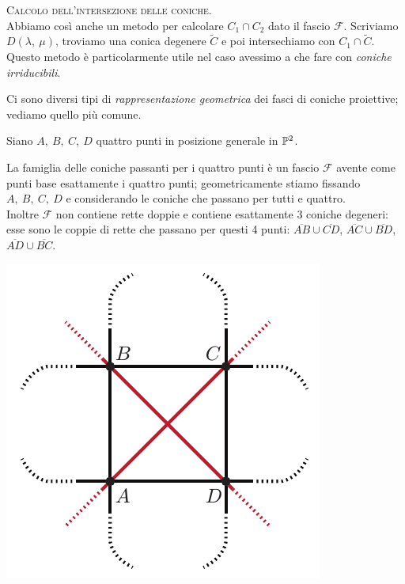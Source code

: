 \begin{tips} \textsc{Calcolo dell'intersezione delle coniche}.\\
	Abbiamo così anche un metodo per calcolare $C_1\cap C_2$ dato il fascio $\mathcal{F}$. Scriviamo $D(\lambda,\ \mu)$, troviamo una conica degenere $\widetilde{C}$ e poi intersechiamo con $C_1\cap\widetilde{C}$. Questo metodo è particolarmente utile nel caso avessimo a che fare con \textit{coniche irriducibili}.
\end{tips}
Ci sono diversi tipi di \textit{rappresentazione geometrica} dei fasci di coniche proiettive; vediamo quello più comune.
\begin{proposition}
	Siano $A,\ B,\ C,\ D$ quattro punti in posizione generale in $\proj[2]{\ }$.\\
	\begin{minipage}{0.75\textwidth}
	La famiglia delle coniche passanti per i quattro punti è un fascio $\mathcal{F}$ avente come punti base esattamente i quattro punti; geometricamente stiamo fissando $A,\ B,\ C,\ D$ e considerando le coniche che passano per tutti e quattro.\\
	Inoltre $\mathcal{F}$ non contiene rette doppie e contiene esattamente 3 coniche degeneri: esse sono le coppie di rette che
	passano per questi 4 punti: $\overline{AB}\cup\overline{CD}$, $\overline{AC}\cup \overline{BD}$, $\overline{AD}\cup\overline{BC}$.
	\end{minipage}
	\hspace{1mm}
	\begin{minipage}{0.24\textwidth}
		\includegraphics[trim=0cm 0cm 0cm 0cm,clip,scale=0.50]{images/conicfamily.pdf}
	\end{minipage}

	
\end{proposition}
